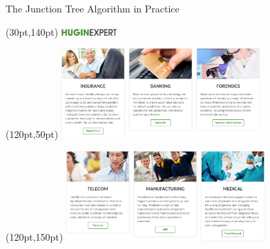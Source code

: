 \documentclass[10pt,usenames,dvipsnames]{beamer}
\begin{document}
\begin{frame}{The Junction Tree Algorithm in Practice}
  \begin{textblock*}{10pt}(30pt,140pt)
    \includegraphics[width=60pt]{figures/hugin-expert/hugin-expert.png}
  \end{textblock*}
  \begin{textblock*}{10pt}(120pt,50pt)
    \includegraphics[width=215pt]{figures/hugin-expert/industry-applications-1.png}
  \end{textblock*}
  \begin{textblock*}{10pt}(120pt,150pt)
    \includegraphics[width=215pt]{figures/hugin-expert/industry-applications-2.png}
  \end{textblock*}
\end{frame}
\end{document}
